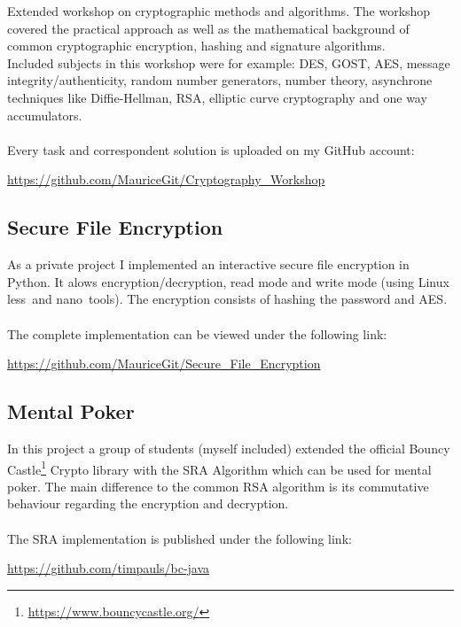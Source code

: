 \documentclass[a4paper, 12pt]{article}
\begin{document}
Extended workshop on cryptographic methods and algorithms. The workshop covered the practical approach as well as
the mathematical background of common cryptographic encryption, hashing and signature algorithms.
\\
Included subjects in this workshop were for example: DES, GOST, AES, message integrity/authenticity, random number
generators, number theory, asynchrone techniques like Diffie-Hellman, RSA, elliptic curve cryptography and one way
accumulators.
\\
\\
Every task and correspondent solution is uploaded on my GitHub account:

\begin{center}
	\url{https://github.com/MauriceGit/Cryptography_Workshop}
\end{center}

\newpage

\subsection{Secure File Encryption}

As a private project I implemented an interactive secure file encryption in Python. It alows encryption/decryption, read mode and write mode (using Linux \glq less\grq\  and \glq nano\grq\ tools). The encryption consists of hashing the password and AES.
\\
\\
The complete implementation can be viewed under the following link:

\begin{center}
	\url{https://github.com/MauriceGit/Secure_File_Encryption}
\end{center}


\subsection{Mental Poker}

In this project a group of students (myself included) extended the official Bouncy Castle\footnote{\url{https://www.bouncycastle.org/}} Crypto library with the SRA Algorithm which can be used
for mental poker. The main difference to the common RSA algorithm is its commutative behaviour regarding 
the encryption and decryption.
\\
\\
The SRA implementation is published under the following link:

\begin{center}
	\url{https://github.com/timpauls/bc-java}
\end{center}
\end{document}
